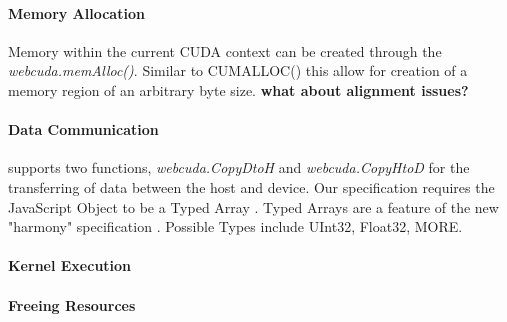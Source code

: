 \paragraph{Memory Allocation} Memory within the current CUDA context can be
created through the \textit{webcuda.memAlloc()}. Similar to CUMALLOC() this
allow for creation of a memory region of an arbitrary byte size. {\bf what about %
alignment issues?}

\paragraph{Data Communication} \name supports two functions,
\textit{webcuda.CopyDtoH} and \textit{webcuda.CopyHtoD} for the transferring of data
between the host and device. Our specification requires the JavaScript Object
to be a Typed Array \cite{typearray}. Typed Arrays are a feature of the new "harmony"
specification \cite{harmony}. Possible Types include UInt32, Float32, MORE.

\paragraph{Kernel Execution}

\paragraph{Freeing Resources}

